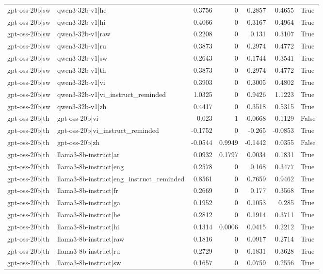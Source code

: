 \begin{table}
\begin{tabular}{l l r r r r l}
gpt-oss-20b|sw & qwen3-32b-v1|he & 0.3756 & 0 & 0.2857 & 0.4655 & True \\
gpt-oss-20b|sw & qwen3-32b-v1|hi & 0.4066 & 0 & 0.3167 & 0.4964 & True \\
gpt-oss-20b|sw & qwen3-32b-v1|raw & 0.2208 & 0 & 0.131 & 0.3107 & True \\
gpt-oss-20b|sw & qwen3-32b-v1|ru & 0.3873 & 0 & 0.2974 & 0.4772 & True \\
gpt-oss-20b|sw & qwen3-32b-v1|sw & 0.2643 & 0 & 0.1744 & 0.3541 & True \\
gpt-oss-20b|sw & qwen3-32b-v1|th & 0.3873 & 0 & 0.2974 & 0.4772 & True \\
gpt-oss-20b|sw & qwen3-32b-v1|vi & 0.3903 & 0 & 0.3005 & 0.4802 & True \\
gpt-oss-20b|sw & qwen3-32b-v1|vi_instruct_reminded & 1.0325 & 0 & 0.9426 & 1.1223 & True \\
gpt-oss-20b|sw & qwen3-32b-v1|zh & 0.4417 & 0 & 0.3518 & 0.5315 & True \\
gpt-oss-20b|th & gpt-oss-20b|vi & 0.023 & 1 & -0.0668 & 0.1129 & False \\
gpt-oss-20b|th & gpt-oss-20b|vi_instruct_reminded & -0.1752 & 0 & -0.265 & -0.0853 & True \\
gpt-oss-20b|th & gpt-oss-20b|zh & -0.0544 & 0.9949 & -0.1442 & 0.0355 & False \\
gpt-oss-20b|th & llama3-8b-instruct|ar & 0.0932 & 0.1797 & 0.0034 & 0.1831 & True \\
gpt-oss-20b|th & llama3-8b-instruct|eng & 0.2578 & 0 & 0.168 & 0.3477 & True \\
gpt-oss-20b|th & llama3-8b-instruct|eng_instruct_reminded & 0.8561 & 0 & 0.7659 & 0.9462 & True \\
gpt-oss-20b|th & llama3-8b-instruct|fr & 0.2669 & 0 & 0.177 & 0.3568 & True \\
gpt-oss-20b|th & llama3-8b-instruct|ga & 0.1952 & 0 & 0.1053 & 0.285 & True \\
gpt-oss-20b|th & llama3-8b-instruct|he & 0.2812 & 0 & 0.1914 & 0.3711 & True \\
gpt-oss-20b|th & llama3-8b-instruct|hi & 0.1314 & 0.0006 & 0.0415 & 0.2212 & True \\
gpt-oss-20b|th & llama3-8b-instruct|raw & 0.1816 & 0 & 0.0917 & 0.2714 & True \\
gpt-oss-20b|th & llama3-8b-instruct|ru & 0.2729 & 0 & 0.1831 & 0.3628 & True \\
gpt-oss-20b|th & llama3-8b-instruct|sw & 0.1657 & 0 & 0.0759 & 0.2556 & True \\

\end{tabular}
\end{table}

